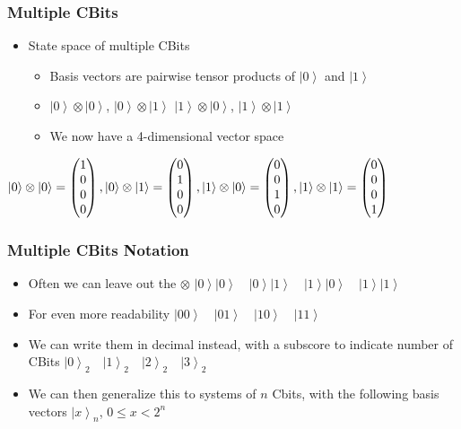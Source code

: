 \documentclass{beamer}
\newcommand{\ket}[1]{\left|{#1}\right\rangle}
\newcommand{\zvec}{\ket{0}}
\newcommand{\ovec}{\ket{1}}
\begin{document}
  \begin{frame}
    \frametitle{Multiple CBits}
    \begin{itemize}
      \item{State space of multiple CBits}
        \begin{itemize}
          \item{Basis vectors are pairwise tensor products of $\zvec$ and $\ovec$}
          \item{$\zvec \otimes \zvec$, $\zvec \otimes \ovec$ $\ovec \otimes \zvec$, $\ovec \otimes \ovec$}
          \item{We now have a 4-dimensional vector space}
        \end{itemize}
    \end{itemize}

    $\zvec \otimes \zvec = \begin{pmatrix}1\\0\\0\\0\end{pmatrix}, 
     \zvec \otimes \ovec = \begin{pmatrix}0\\1\\0\\0\end{pmatrix}, \linebreak
     \ovec \otimes \zvec = \begin{pmatrix}0\\0\\1\\0\end{pmatrix},
     \ovec \otimes \ovec = \begin{pmatrix}0\\0\\0\\1\end{pmatrix}$
  \end{frame}
  
  \begin{frame}
    \frametitle{Multiple CBits Notation}
    \begin{itemize}
      \item{Often we can leave out the $\otimes$} \linebreak
      $\zvec\zvec \quad \zvec\ovec \quad \ovec\zvec \quad \ovec\ovec$
      \item{For even more readability} \linebreak
      $\ket{00} \quad \ket{01} \quad \ket{10} \quad \ket{11}$
      \item{We can write them in decimal instead, with a subscore to indicate number of CBits} \linebreak
      $\ket{0}_{2} \quad \ket{1}_{2} \quad \ket{2}_{2} \quad \ket{3}_{2}$
      \item{We can then generalize this to systems of $n$ Cbits, with the following basis vectors} \linebreak
      $\ket{x}_{n}$, $0 \leq x < 2^{n}$
    \end{itemize}
  \end{frame}
\end{document}
